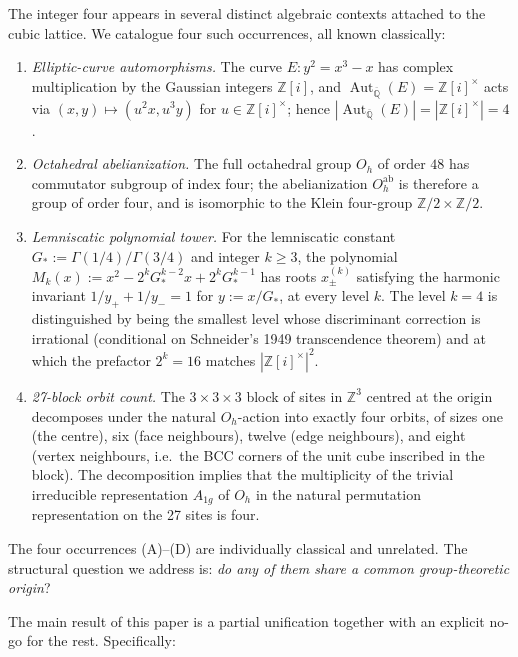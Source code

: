 \documentclass[11pt,reqno]{amsart}
\theoremstyle{plain}
\theoremstyle{definition}
\theoremstyle{remark}
\numberwithin{equation}{section}
\newcommand{\Gstar}{G_{\!*}}
\newcommand{\Aut}{\operatorname{Aut}}
\begin{document}
The integer four appears in several distinct algebraic contexts
attached to the cubic lattice. We catalogue four such occurrences,
all known classically:

\begin{enumerate}[label=\textup{(\Alph*)}, leftmargin=*]
\item \emph{Elliptic-curve automorphisms.} The curve
$E\colon y^{2} = x^{3} - x$ has complex multiplication by the
Gaussian integers $\mathbb{Z}[i]$, and
$\Aut_{\overline{\mathbb{Q}}}(E) = \mathbb{Z}[i]^{\times}$ acts via
$(x, y) \mapsto (u^{2} x, u^{3} y)$ for $u \in \mathbb{Z}[i]^{\times}$;
hence $|\Aut_{\overline{\mathbb{Q}}}(E)| =
|\mathbb{Z}[i]^{\times}| = 4$.
\item \emph{Octahedral abelianization.} The full octahedral group
$O_{h}$ of order $48$ has commutator subgroup of index four; the
abelianization $O_{h}^{\mathrm{ab}}$ is therefore a group of order
four, and is isomorphic to the Klein four-group
$\mathbb{Z}/2 \times \mathbb{Z}/2$.
\item \emph{Lemniscatic polynomial tower.} For the lemniscatic
constant $\Gstar := \Gamma(1/4)/\Gamma(3/4)$ and integer $k \geq 3$,
the polynomial
$M_{k}(x) := x^{2} - 2^{k} \Gstar^{k-2} x + 2^{k} \Gstar^{k-1}$
has roots $x_{\pm}^{(k)}$ satisfying the harmonic invariant
$1/y_{+} + 1/y_{-} = 1$ for $y := x/\Gstar$, at every level $k$. The
level $k = 4$ is distinguished by being the smallest level whose
discriminant correction is irrational (conditional on Schneider's
1949 transcendence theorem) and at which the prefactor $2^{k} = 16$
matches $|\mathbb{Z}[i]^{\times}|^{2}$.
\item \emph{27-block orbit count.} The $3 \times 3 \times 3$ block
of sites in $\mathbb{Z}^{3}$ centred at the origin decomposes under
the natural $O_{h}$-action into exactly four orbits, of sizes one
(the centre), six (face neighbours), twelve (edge neighbours), and
eight (vertex neighbours, i.e.\ the BCC corners of the unit cube
inscribed in the block). The decomposition implies that the
multiplicity of the trivial irreducible representation $A_{1g}$ of
$O_{h}$ in the natural permutation representation on the 27 sites is
four.
\end{enumerate}

The four occurrences (A)--(D) are individually classical and
unrelated. The structural question we address is: \emph{do any of
them share a common group-theoretic origin}?

The main result of this paper is a partial unification together with
an explicit no-go for the rest. Specifically:
\end{document}
